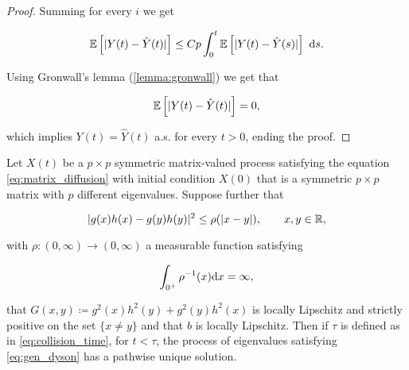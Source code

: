 \begin{proof}
    Summing for every $i$ we get

    \begin{equation*}
        \mathbb E \left[ \lvert Y(t) - \hat Y(t) \rvert \right] \le  Cp\int_0^t \mathbb E \left[ \lvert Y(t) - \hat Y(s) \rvert \right]~\mathrm d s.
    \end{equation*}

    Using Gronwall's lemma (\ref{lemma:gronwall}) we get that

    \begin{equation*}
        \mathbb E \left[ \lvert Y(t) - \hat Y(t) \rvert \right] = 0, 
    \end{equation*}

    \noindent which implies $Y(t) = \hat Y(t)$ a.s. for every $t>0$, ending the proof.
\end{proof}




\begin{theorem} \label{thm:spectral_yamadawatanabe}
    Let $X(t)$ be a $p\times p$ symmetric matrix-valued process satisfying the equation \eqref{eq:matrix_diffusion} with initial condition $X(0)$ that is a symmetric $p\times p$ matrix with $p$ different eigenvalues. Suppose further that

    \begin{equation}
        \lvert  g(x)h(x) - g(y)h(y)  \rvert^2 \le \rho(\lvert x-y \rvert), \qquad x,y \in \mathbb R,
    \end{equation}

    \noindent with $\rho:(0,\infty)\to(0,\infty)$ a measurable function satisfying

    \[ \int_{0^+} \rho^{-1}(x) \mathrm d x = \infty, \]

    \noindent that $G(x,y) \coloneqq g^2(x)h^2(y) + g^2(y)h^2(x)$ is locally Lipschitz and strictly positive on the set $\{ x \neq y\}$ and that $b$ is locally Lipschitz. Then if $\tau$ is defined as in \eqref{eq:collision_time}, for $t < \tau$, the process of eigenvalues satisfying \eqref{eq:gen_dyson} has a pathwise unique solution.
\end{theorem}


